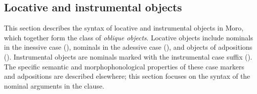 %
%

%

\subsection{Locative and instrumental objects}\label{sec:ch12:locobj}

This section describes the syntax of locative and instrumental objects in Moro, which together form the class of \textit{oblique objects}. Locative objects include nominals in the inessive case (), nominals in the adessive case (), and objects of adpositions (). Instrumental objects are nominals marked with the instrumental case suffix (). The specific semantic and morphophonological properties of these case markers and adpositions are described elsewhere; this section focuses on the syntax of the nominal arguments in the clause.

